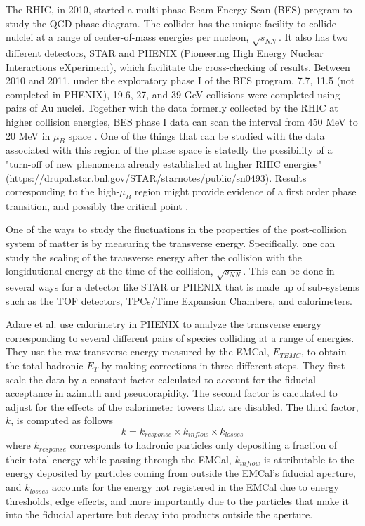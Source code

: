 The RHIC, in 2010, started a multi-phase Beam Energy Scan (BES) program to study the QCD phase diagram. The collider has the unique facility to collide nulclei at a range of center-of-mass energies per nucleon, $\sqrt{s_{NN}}$. It also has two different detectors, STAR and PHENIX (Pioneering High Energy Nuclear Interactions eXperiment), which facilitate the cross-checking of results. Between 2010 and 2011, under the exploratory phase I of the BES program, 7.7, 11.5 (not completed in PHENIX), 19.6, 27, and 39 GeV collisions were completed using pairs of Au nuclei. Together with the data formerly collected by the RHIC at higher collision energies, BES phase I data can scan the interval from 450 MeV to 20 MeV in $\mu_{B}$ space \cite{1742-6596-455-1-012037, LUO201675}. One of the things that can be studied with the data associated with this region of the phase space is statedly the possibility of a "turn-off of new phenomena already established at higher RHIC energies" (https://drupal.star.bnl.gov/STAR/starnotes/public/sn0493). Results corresponding to the high-$\mu_{B}$ region might provide evidence of a first order phase transition, and possibly the critical point \cite{LUO201675}.

One of the ways to study the fluctuations in the properties of the post-collision system of matter is by measuring the transverse energy. Specifically, one can study the scaling of the transverse energy after the collision with the longidutional energy at the time of the collision, $\sqrt{s_{NN}}$. This can be done in several ways for a detector like STAR or PHENIX that is made up of sub-systems such as the TOF detectors, TPCs/Time Expansion Chambers, and calorimeters. 

Adare et al. \cite{Adare:2015bua} use calorimetry in PHENIX to analyze the transverse energy corresponding to several different pairs of species colliding at a range of energies. They use the raw transverse energy measured by the EMCal, $E_{{T}EMC}$, to obtain the total hadronic $E_{T}$ by making corrections in three different steps. They first scale the data by a constant factor calculated to account for the fiducial acceptance in azimuth and pseudorapidity. The second factor is calculated to adjust for the effects of the calorimeter towers that are disabled. The third factor, $k$, is computed as follows
\begin{equation}\label{eqn:AdareKfactor}
k = k_{response} \times k_{inflow} \times k_{losses}
\end{equation}
where $k_{response}$ corresponds to hadronic particles only depositing a fraction of their total energy while passing through the EMCal, $k_{inflow}$ is attributable to the energy deposited by particles coming from outside the EMCal's fiducial aperture, and $k_{losses}$ accounts for the energy not registered in the EMCal due to energy thresholds, edge effects, and more importantly due to the particles that make it into the fiducial aperture but decay into products outside the aperture.

